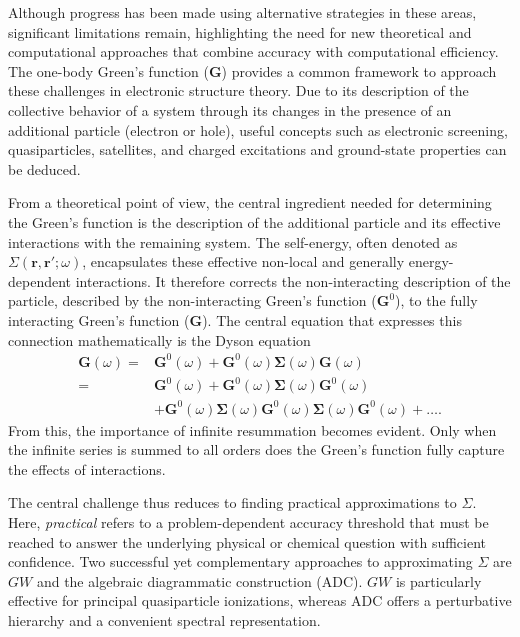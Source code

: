 \documentclass[aip,jcp,reprint,noshowkeys,superscriptaddress]{revtex4-2}
\newcommand{\bG}{\boldsymbol{G}}
\newcommand{\br}{\boldsymbol{r}}
\begin{document}
Although progress has been made using alternative strategies in these areas, significant limitations remain, highlighting the need for new theoretical and computational approaches that combine accuracy with computational efficiency.
The one-body Green's function ($\bG$) provides a common framework to approach these challenges in electronic structure theory.
Due to its description of the collective behavior of a system through its changes in the presence of an additional particle (electron or hole), useful concepts such as electronic screening, quasiparticles, satellites, and charged excitations and ground-state properties can be deduced.

From a theoretical point of view, the central ingredient needed for determining the Green's function is the description of the additional particle and its effective interactions with the remaining system.
The self-energy, often denoted as $\Sigma(\br,\br';\omega)$, encapsulates these effective non-local and generally energy-dependent interactions.
It therefore corrects the non-interacting description of the particle, described by the non-interacting Green's function ($\bG^0$), to the fully interacting Green's function ($\bG$).
The central equation that expresses this connection mathematically is the Dyson equation
\begin{align}
    \bG(\omega) =& \bG^0(\omega) + \bG^0(\omega) \pmb{\Sigma}(\omega) \bG(\omega) \nonumber \\
    =& \bG^0(\omega) + \bG^0(\omega) \pmb{\Sigma}(\omega) \bG^0(\omega) \nonumber \\
    &+ \bG^0(\omega) \pmb{\Sigma}(\omega) \bG^0(\omega) \pmb{\Sigma}(\omega) \bG^0(\omega) + \dots.
    \label{eq:Dyson}
\end{align}
From this, the importance of infinite resummation becomes evident. 
Only when the infinite series is summed to all orders does the Green's function fully capture the effects of interactions.

The central challenge thus reduces to finding practical approximations to $\Sigma$.
Here, \emph{practical} refers to a problem-dependent accuracy threshold that must be reached to answer the underlying physical or chemical question with sufficient confidence.
Two successful yet complementary approaches to approximating $\Sigma$ are $GW$ and the algebraic diagrammatic construction (ADC).
$GW$ is particularly effective for principal quasiparticle ionizations, whereas ADC offers a perturbative hierarchy and a convenient spectral representation.
\end{document}
